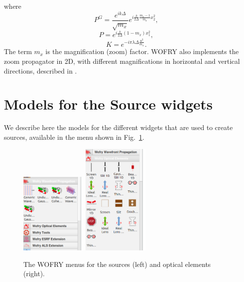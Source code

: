 \documentclass{iopconfser}
\begin{document}
where
\begin{equation}
P^G =  \frac { e^{ik\Delta }}{\sqrt{m_x} }e^{i \frac{k}{2 \Delta} \frac{m_x - 1}{m_x}x_2^2},
\end{equation}
\begin{equation}
P = e^{i \frac{k}{2\Delta} (1-m_x)x_1^2 },
\end{equation}
\begin{equation}
K = e^{-i \pi \lambda \Delta \frac{u^2}{m_x} }.
\end{equation}
The term $m_x$ is the magnification (zoom) factor. WOFRY also implements the zoom propagator in 2D, with different magnifications in horizontal and vertical directions, described in \citep{pirro}.


\section{Models for the Source widgets}

We describe here the models for the different widgets that are used to create sources, available in the menu shown in Fig.~\ref{fig:oasysmenus}.

\begin{figure}
    \centering
    \includegraphics[width=0.29\textwidth]{figures/oasyssources.png}
    \includegraphics[width=0.29\textwidth]
    {figures/oasyselements.png}
        
    \caption{The WOFRY menus for the sources (left) and optical elements (right).}
    \label{fig:oasysmenus}
\end{figure}
\end{document}
